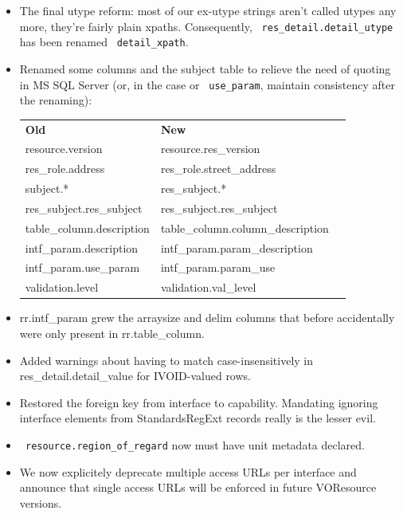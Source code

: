 \documentclass[11pt,a4paper]{ivoa}
\newcommand{\rtent}[1]{\texttt{\color{rtcolor} #1}}
\begin{document}
\begin{itemize}

\item The final utype reform: most of our ex-utype strings aren't called utypes
  any more, they're fairly plain xpaths.  Consequently, 
  \rtent{res\_detail.detail\_utype} has been renamed 
  \rtent{detail\_xpath}.{}

\item Renamed some columns and the subject table to relieve the need of quoting
  in MS SQL Server (or, in the case or \rtent{use\_param}, maintain
  consistency after the renaming):\\

\begin{tabular}{lll}

\textbf{Old}&
\textbf{New}\\
resource.version&resource.res\_version\\
res\_role.address&res\_role.street\_address\\
subject.*&res\_subject.*\\
res\_subject.res\_subject&res\_subject.res\_subject\\
table\_column.description&table\_column.column\_description\\
intf\_param.description&intf\_param.param\_description\\
intf\_param.use\_param&intf\_param.param\_use\\
validation.level&validation.val\_level\\

\end{tabular}

\item rr.intf\_param grew the arraysize and delim columns that before
    accidentally were only present in rr.table\_column.{}

\item Added warnings about having to match case-insensitively in
  res\_detail.detail\_value for IVOID-valued rows.{}

\item Restored the foreign key from interface to capability.  Mandating
  ignoring interface elements from StandardsRegExt records really is the
  lesser evil.{}

\item \rtent{resource.region\_of\_regard} now must have unit metadata
  declared.{}

\item We now explicitely deprecate multiple access URLs per interface
  and announce that single access URLs will be enforced in future
  VOResource versions.{}

\end{itemize}
\end{document}
